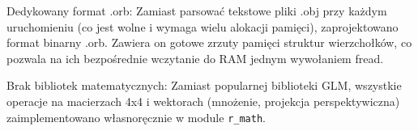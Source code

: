      Dedykowany format .orb: Zamiast parsować tekstowe pliki .obj przy każdym uruchomieniu (co jest wolne i wymaga wielu alokacji pamięci), zaprojektowano format binarny .orb. Zawiera on gotowe zrzuty pamięci struktur wierzchołków, co pozwala na ich bezpośrednie wczytanie do RAM jednym wywołaniem fread.

     Brak bibliotek matematycznych: Zamiast popularnej biblioteki GLM, wszystkie operacje na macierzach 4x4 i wektorach (mnożenie, projekcja perspektywiczna) zaimplementowano własnoręcznie w module \texttt{r\_math}.

